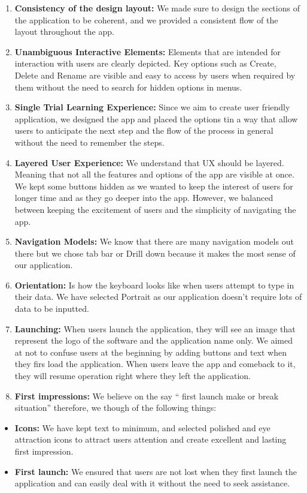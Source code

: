\documentclass{article}
\begin{document}
\begin{enumerate}
\item \textbf{Consistency of the design layout:} We made sure to design the sections of the application to be coherent, and we provided a consistent flow of the layout throughout the app.
\item \textbf{Unambiguous Interactive Elements:} Elements that are intended for interaction with users are clearly depicted. Key options such as Create, Delete and Rename are visible and easy to access by users when required by them without the need to search for hidden options in menus.
\item \textbf{Single Trial Learning Experience:}  Since we aim to create user friendly application, we designed the app and placed the options tin a way that allow users to anticipate the next step and the flow of the process in general without the need to remember the steps.
\item \textbf{Layered User Experience:} We understand that UX should be layered. Meaning that not all the features and options of the app are visible at once. We kept some buttons hidden as we wanted to keep the interest of users for longer time and as they go deeper into the app. However, we balanced between keeping the excitement of users and the simplicity of navigating the app.
\item \textbf{Navigation Models:} We know that there are many navigation models out there but we chose tab bar or Drill down because it makes the most sense of our application.
\item \textbf{Orientation:} Is how the keyboard looks like when users attempt to type in their data. We have selected Portrait as our application doesn’t require lots of data to be inputted.
\item \textbf{Launching:} When users launch the application, they will see an image that represent the logo of the software and the application name only. We aimed at not to confuse users at the beginning by adding buttons and text when they firs load the application. When users leave the app and comeback to it, they will resume operation right where they left the application.
\item \textbf{First impressions:} We believe on the say “ first launch make or break situation” therefore, we though of the following things:
\end{enumerate}
\begin{itemize}
\item \textbf{Icons:} We have kept text to minimum, and selected polished and eye attraction icons to attract users attention and create excellent and lasting first impression.
\item \textbf{First launch:} We ensured that users are not lost when they first launch the application and can easily deal with it without the need to seek assistance.
\end{itemize}
\end{document}
